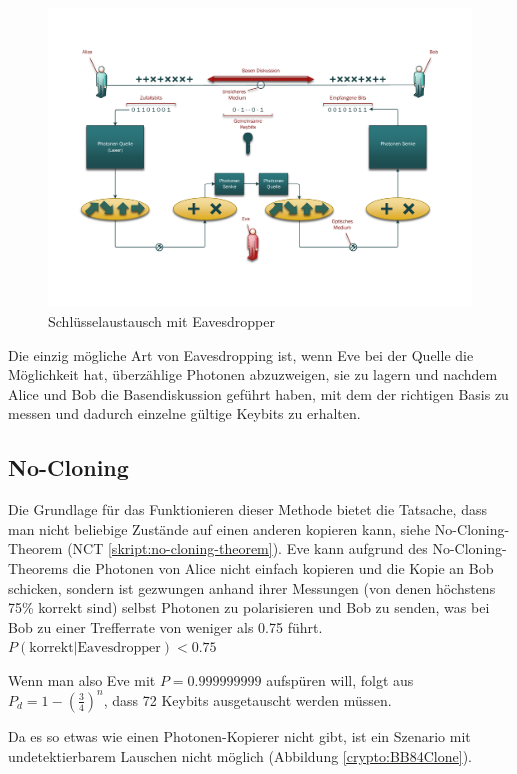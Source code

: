   \begin{figure}
    \centering
    \includegraphics[height=0.45\textheight]{crypto/BB84Eve.pdf}
    \caption{Schl\"usselaustausch mit Eavesdropper\label{crypto:BB84Eve}}
  \end{figure}

  Die einzig m\"ogliche Art von Eavesdropping ist, wenn Eve bei der Quelle die M\"oglichkeit hat, \"uberz\"ahlige Photonen abzuzweigen,
  sie zu lagern und nachdem Alice und Bob die Basendiskussion gef\"uhrt haben,
  mit dem der richtigen Basis zu messen und dadurch einzelne g\"ultige Keybits zu erhalten.

  \subsection{No-Cloning}
  Die Grundlage f\"ur das Funktionieren dieser Methode bietet die Tatsache, dass man nicht beliebige Zust\"ande auf einen anderen kopieren kann, siehe No-Cloning-Theorem (NCT \ref{skript:no-cloning-theorem}).
  Eve kann aufgrund des No-Cloning-Theorems die Photonen von Alice nicht einfach kopieren und die Kopie an Bob schicken,
  sondern ist gezwungen anhand ihrer Messungen (von denen h\"ochstens 75\% korrekt sind) selbst Photonen zu polarisieren
  und Bob zu senden, was bei Bob zu einer Trefferrate von weniger als 0.75 f\"uhrt.
  $P(\text{korrekt}|\text{Eavesdropper})<0.75$

  Wenn man also Eve mit $P=0.999999999$ aufsp\"uren will,
  folgt aus $P_d = 1 - \left(\frac{3}{4}\right)^n$,
  dass 72 Keybits ausgetauscht werden m\"ussen.

  Da es so etwas wie einen Photonen-Kopierer nicht gibt, ist ein Szenario mit undetektierbarem Lauschen nicht m\"oglich (Abbildung \ref{crypto:BB84Clone}).

